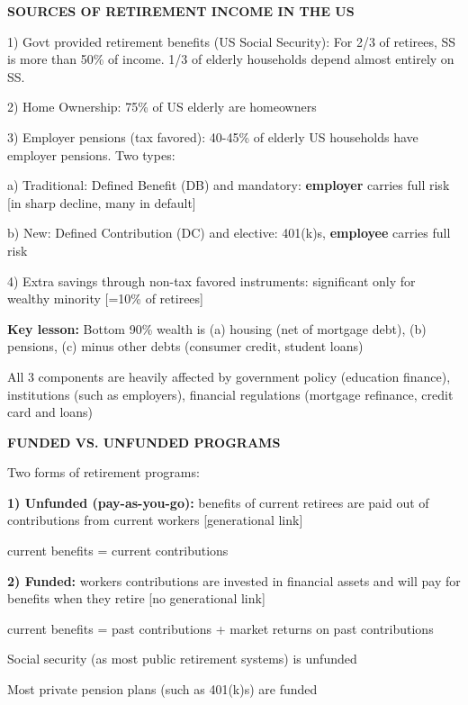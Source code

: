\documentclass[landscape]{slides}
\begin{document}
\begin{slide}
\begin{center}
{\bf SOURCES OF RETIREMENT INCOME IN THE US}
\end{center}
1) Govt provided retirement benefits (US Social Security):
For 2/3 of retirees, SS is more than 50\% of income. 1/3 of
elderly households depend almost entirely on SS.

2) Home Ownership: 75\% of US elderly are homeowners

3) Employer pensions (tax favored): 40-45\% of elderly US households have employer pensions.
Two types:

a) Traditional: Defined Benefit (DB) and mandatory: {\bf employer} carries full
risk [in sharp decline, many in default]

b) New: Defined Contribution (DC) and elective: 401(k)s, {\bf employee}
carries full risk



4) Extra savings through non-tax favored instruments:
significant only for wealthy minority [=10\% of retirees]

\textbf{Key lesson:} Bottom 90\% wealth is (a) housing (net of mortgage debt), (b) pensions,
(c) minus other debts (consumer credit, student loans) 

All 3 components are heavily affected by government policy (education finance), institutions (such as employers), financial regulations (mortgage refinance, credit card and loans)

\end{slide}



\begin{slide}
\begin{center}
{\bf FUNDED VS. UNFUNDED PROGRAMS}
\end{center}
Two forms of retirement programs:

{\bf 1) Unfunded (pay-as-you-go):} benefits of current retirees are
paid out of contributions from current workers [generational link]

current benefits = current contributions

{\bf 2) Funded:} workers contributions are invested in financial
assets and will pay for benefits when they retire [no generational
link]

current benefits = past contributions + market returns on past contributions

Social security (as most public retirement systems) is unfunded

Most private pension plans (such as 401(k)s) are funded

\end{slide}
\end{document}
